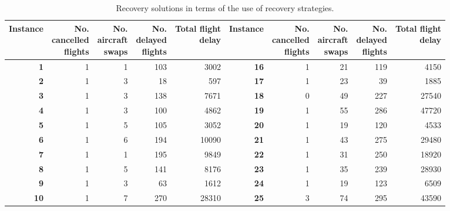 \begin{table}[H]
	\centering
	\caption{Recovery solutions in terms of the use of recovery strategies.}
	\SupplementTableSetup
\begin{tabular*}{\linewidth}{@{\extracolsep{\fill}}rrrrr@{\hspace{1.5em}}rrrrr@{}}
    \toprule
    \textbf{Instance} & \shortstack{No.\\cancelled\\flights} & \shortstack{No.\\aircraft\\swaps} & \shortstack{No.\\delayed\\flights} & \shortstack{Total flight\\delay} & \textbf{Instance} & \shortstack{No.\\cancelled\\flights} & \shortstack{No.\\aircraft\\swaps} & \shortstack{No.\\delayed\\flights} & \shortstack{Total flight\\delay} \\
    \midrule
    \textbf{1} & 1     & 1     & 103   & 3002  & \textbf{16} & 1     & 21    & 119   & 4150  \\
    \textbf{2} & 1     & 3     & 18    & 597   & \textbf{17} & 1     & 23    & 39    & 1885  \\
    \textbf{3} & 1     & 3     & 138   & 7671  & \textbf{18} & 0     & 49    & 227   & 27540  \\
    \textbf{4} & 1     & 3     & 100   & 4862  & \textbf{19} & 1     & 55    & 286   & 47720  \\
    \textbf{5} & 1     & 5     & 105   & 3052  & \textbf{20} & 1     & 19    & 120   & 4533  \\
    \textbf{6} & 1     & 6     & 194   & 10090  & \textbf{21} & 1     & 43    & 275   & 29480  \\
    \textbf{7} & 1     & 1     & 195   & 9849  & \textbf{22} & 1     & 31    & 250   & 18920  \\
    \textbf{8} & 1     & 5     & 141   & 8176  & \textbf{23} & 1     & 35    & 239   & 28930  \\
    \textbf{9} & 1     & 3     & 63    & 1612  & \textbf{24} & 1     & 19    & 123   & 6509  \\
    \textbf{10} & 1     & 7     & 270   & 28310  & \textbf{25} & 3     & 74    & 295   & 43590  \\

\end{tabular*}
\end{table}
